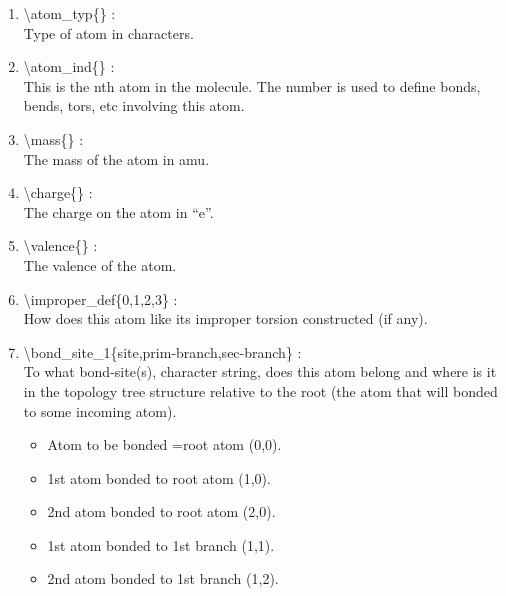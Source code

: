 \documentclass[12pt,titlepage]{article}
\begin{document}
\begin{enumerate}

 \vspace{0.15in} 
 \item  \textbackslash{}atom\_typ\{\} : \\ 
   Type of atom in characters.
 
 \vspace{0.15in} 
 \item  \textbackslash{}atom\_ind\{\} : \\ 
   This is the nth atom in the molecule. The number is used to 
   define bonds, bends, tors, etc involving this atom.

 \vspace{0.15in} 
 \item  \textbackslash{}mass\{\} : \\ 
    The mass of the atom in amu.

 \vspace{0.15in} 
 \item  \textbackslash{}charge\{\} : \\ 
    The charge on the atom in ``e''.

 \vspace{0.15in} 
 \item  \textbackslash{}valence\{\} : \\ 
    The valence of the atom.

 \vspace{0.15in} 
 \item  \textbackslash{}improper\_def\{0,1,2,3\} : \\ 
    How does this atom like its improper torsion constructed (if any).

 \vspace{0.15in} 
 \item  \textbackslash{}bond\_site\_1\{site,prim-branch,sec-branch\} : \\ 
    To what bond-site(s), character string, does this atom belong and where is
    it in the topology tree structure relative to the root (the atom
    that will bonded to some incoming atom).
      \begin{itemize}
        \item Atom to be bonded =root atom  (0,0).
        \item 1st atom bonded to root atom  (1,0).
        \item 2nd atom bonded to root atom  (2,0).
        \item 1st atom bonded to 1st branch (1,1).
        \item 2nd atom bonded to 1st branch (1,2).
      \end{itemize}



\end{enumerate}
\end{document}
